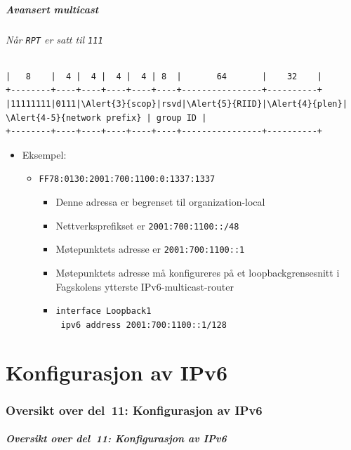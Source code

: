 \begin{frame}[fragile]%
  \frametitle{Avansert multicast}
  \framesubtitle{Når \texttt{RPT} er satt til \texttt{111}}
\begin{Verbatim}[commandchars=\\\{\},fontsize=\tiny]
|   8    |  4 |  4 |  4 |  4 | 8  |       64       |    32    |
+--------+----+----+----+----+----+----------------+----------+
|11111111|0111|\Alert{3}{scop}|rsvd|\Alert{5}{RIID}|\Alert{4}{plen}| \Alert{4-5}{network prefix} | group ID |
+--------+----+----+----+----+----+----------------+----------+
\end{Verbatim}
  \begin{itemize}[<+->]
  \item Eksempel:
    \begin{itemize}[<+->]
    \item \texttt{FF7\alert<3>{8}:0\alert<5>{1}\alert<4>{30}:\alert<4-5>{2001:700:1100:0}:1337:1337}
      \begin{itemize}[<+->]
      \item Denne adressa er begrenset til \alert<3>{organization-local}
      \item Nettverksprefikset er \texttt{\alert<4>{2001:700:1100}::/\alert<4>{48}}
      \item Møtepunktets adresse er \alert<6>{\texttt{\alert<5>{2001:700:1100}::\alert<5>{1}}}
      \item Møtepunktets adresse må konfigureres på et
        loopbackgrensesnitt i Fagskolens ytterste
        IPv6-multicast-router
      \item \texttt{interface Loopback1}\\
        \texttt{\ ipv6 address 2001:700:1100::1/128}
      \end{itemize}
    \end{itemize}
  \end{itemize}
\end{frame}

\part{Konfigurasjon av IPv6}

\begin{frame}
  \partpage
\end{frame}

\section*{Oversikt over del~11: Konfigurasjon av IPv6}
\begin{frame}[allowframebreaks]
  \frametitle{Oversikt over del~11: Konfigurasjon av IPv6}
    \tableofcontents%
\end{frame}


